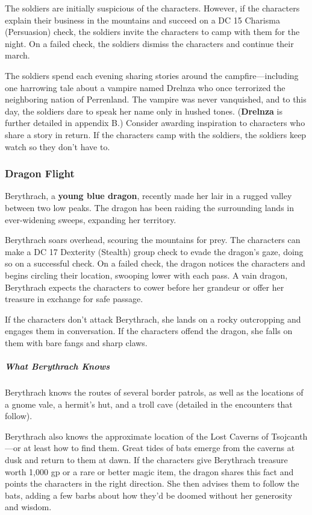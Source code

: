 \documentclass[10pt,a4paper,twoside,bg=print,twocolumn,openany,nodeprecatedcode]{dndbook}
\begin{document}
The soldiers are initially suspicious of the characters. However, if the characters explain their business in the mountains and succeed on a DC 15 Charisma (Persuasion) check, the soldiers invite the characters to camp with them for the night. On a failed check, the soldiers dismiss the characters and continue their march.

The soldiers spend each evening sharing stories around the campfire—including one harrowing tale about a vampire named Drelnza who once terrorized the neighboring nation of Perrenland. The vampire was never vanquished, and to this day, the soldiers dare to speak her name only in hushed tones. (\textbf{Drelnza} is further detailed in appendix B.) Consider awarding inspiration to characters who share a story in return. If the characters camp with the soldiers, the soldiers keep watch so they don't have to.

\subsubsection{Dragon Flight}
Berythrach, a \textbf{young blue dragon}, recently made her lair in a rugged valley between two low peaks. The dragon has been raiding the surrounding lands in ever-widening sweeps, expanding her territory.

Berythrach soars overhead, scouring the mountains for prey. The characters can make a DC 17 Dexterity (Stealth) group check to evade the dragon's gaze, doing so on a successful check. On a failed check, the dragon notices the characters and begins circling their location, swooping lower with each pass. A vain dragon, Berythrach expects the characters to cower before her grandeur or offer her treasure in exchange for safe passage.

If the characters don't attack Berythrach, she lands on a rocky outcropping and engages them in conversation. If the characters offend the dragon, she falls on them with bare fangs and sharp claws.

\subparagraph{What Berythrach Knows}
Berythrach knows the routes of several border patrols, as well as the locations of a gnome vale, a hermit's hut, and a troll cave (detailed in the encounters that follow).

Berythrach also knows the approximate location of the Lost Caverns of Tsojcanth—or at least how to find them. Great tides of bats emerge from the caverns at dusk and return to them at dawn. If the characters give Berythrach treasure worth 1,000 gp or a rare or better magic item, the dragon shares this fact and points the characters in the right direction. She then advises them to follow the bats, adding a few barbs about how they'd be doomed without her generosity and wisdom.
\end{document}
